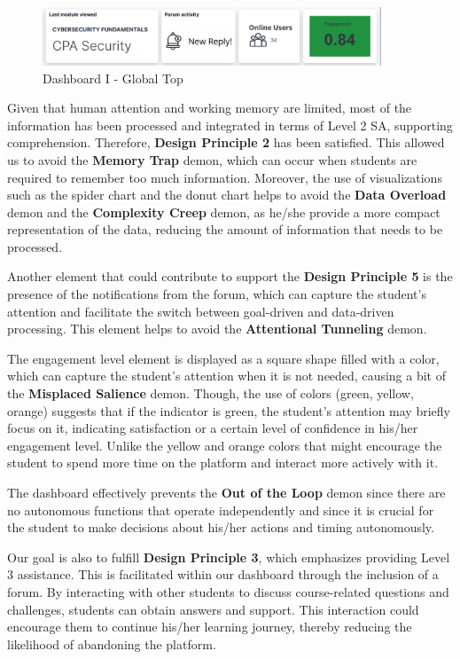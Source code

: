 \begin{figure}[H]
    \centering
    \includegraphics[width=0.9\textwidth]{assets/dashboard_1_globaltop.png}
    \caption{Dashboard I - Global Top}
    \label{fig:dashboard_1_global_top}
\end{figure}

Given that human attention and working memory are limited, most of the information has been processed and integrated in terms of Level 2 SA, supporting comprehension. Therefore, \textbf{Design Principle 2} has been satisfied.
This allowed us to avoid the \textbf{Memory Trap} demon, which can occur when students are required to remember too much information. 
Moreover, the use of visualizations such as the spider chart and the donut chart helps to avoid the \textbf{Data Overload} demon and the \textbf{Complexity Creep} demon, as he/she provide a more compact representation of the data, reducing the amount of information that needs to be processed.

Another element that could contribute to support the \textbf{Design Principle 5} is the presence of the notifications from the forum, which can capture the student's attention and facilitate the switch between goal-driven and data-driven processing. This element helps to avoid the \textbf{Attentional Tunneling} demon.

The engagement level element is displayed as a square shape filled with a color, which can capture the student's attention when it is not needed, causing a bit of the \textbf{Misplaced Salience} demon. 
Though, the use of colors (green, yellow, orange) suggests that if the indicator is green, the student's attention may briefly focus on it, indicating satisfaction or a certain level of confidence in his/her engagement level. Unlike the yellow and orange colors that might encourage the student to spend more time on the platform and interact more actively with it.

The dashboard effectively prevents the \textbf{Out of the Loop} demon since there are no autonomous functions that operate independently and since it is crucial for the student to make decisions about his/her actions and timing autonomously.

Our goal is also to fulfill \textbf{Design Principle 3}, which emphasizes providing Level 3 assistance. 
This is facilitated within our dashboard through the inclusion of a forum. By interacting with other students to discuss course-related 
questions and challenges, students can obtain answers and support. This interaction could encourage them to continue his/her learning journey, 
thereby reducing the likelihood of abandoning the platform. 

